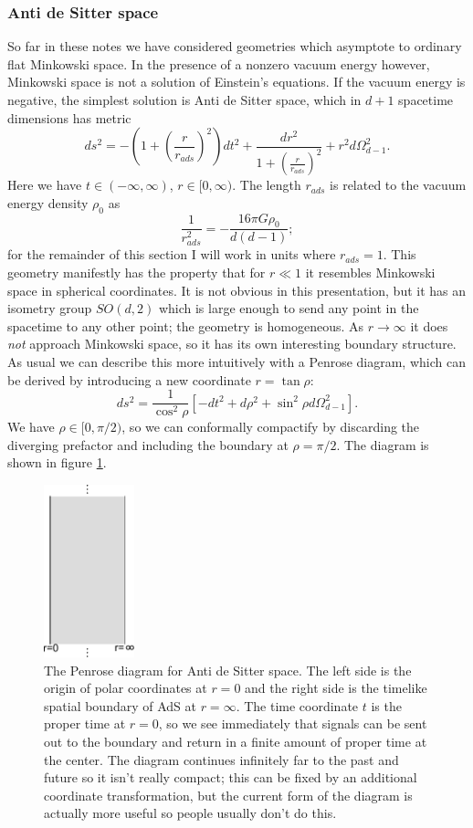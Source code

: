 \documentclass[12pt]{article}
\newcommand{\be}{\begin{equation}}
\newcommand{\ee}{\end{equation}}
\begin{document}
\subsubsection{Anti de Sitter space}
So far in these notes we have considered geometries which asymptote to ordinary flat Minkowski space.  In the presence of a nonzero vacuum energy however, Minkowski space is not a solution of Einstein's equations.  If the vacuum energy is negative, the simplest solution is Anti de Sitter space, which in $d+1$ spacetime dimensions has metric
\be\label{adsmetric}
ds^2=-\left(1+\left(\frac{r}{r_{\mathit{ads}}}\right)^2\right)dt^2+\frac{dr^2}{1+\left(\frac{r}{r_{\mathit{ads}}}\right)^2}+r^2d\Omega_{d-1}^2.
\ee
Here we have $t\in (-\infty,\infty)$, $r\in [0,\infty)$.  The length $r_{\mathit{ads}}$ is related to the vacuum energy density $\rho_0$ as
\be
\frac{1}{r_{\mathit{ads}}^2}=-\frac{16\pi G \rho_0}{d(d-1)};
\ee
for the remainder of this section I will work in units where $r_{\mathit{ads}}=1$.  This geometry manifestly has the property that for $r\ll 1$ it resembles Minkowski space in spherical coordinates.  It is not obvious in this presentation, but it has an isometry group $SO(d,2)$ which is large enough to send any point in the spacetime to any other point; the geometry is homogeneous.  As $r\to \infty$ it does \textit{not} approach Minkowski space, so it has its own interesting boundary structure.  As usual we can describe this more intuitively with a Penrose diagram, which can be derived by introducing a new coordinate $r=\tan \rho$:
\be
ds^2=\frac{1}{\cos^2 \rho}\left[-dt^2+d\rho^2+\sin^2\rho d\Omega_{d-1}^2\right].
\ee
We have $\rho\in [0,\pi/2)$, so we can conformally compactify by discarding the diverging prefactor and including the boundary at $\rho=\pi/2$.  The diagram is shown in figure \ref{adspen}.
\begin{figure}
\begin{center}
\includegraphics[height=5cm]{adspen.pdf}
\caption{The Penrose diagram for Anti de Sitter space.  The left side is the origin of polar coordinates at $r=0$ and the right side is the timelike spatial boundary of AdS at $r=\infty$.  The time coordinate $t$ is the proper time at $r=0$, so we see immediately that signals can be sent out to the boundary and return in a finite amount of proper time at the center.  The diagram continues infinitely far to the past and future so it isn't really compact; this can be fixed by an additional coordinate transformation, but the current form of the diagram is actually more useful so people usually don't do this.}\label{adspen}
\end{center}
\end{figure}
\end{document}
